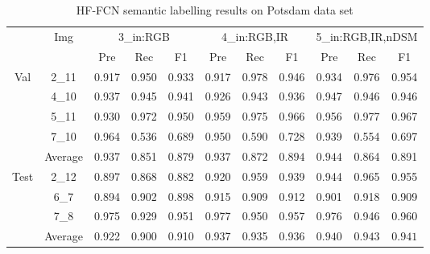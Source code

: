 \documentclass{article}
\begin{document}
   \begin{table}[!h!b!p]
    \caption {HF-FCN semantic labelling results on Potsdam data set}
    \begin{center}
    \begin{tabular}{c|c|c|c|c|c|c|c|c|c|c}
     \hline
    &\multirow{2}{*}{Img}&\multicolumn{3}{c}{3\_in:RGB} &\multicolumn{3}{|c|}{4\_in:RGB,IR}&\multicolumn{3}{c}{5\_in:RGB,IR,nDSM}\\
     \cline{3-11}
    && Pre &Rec & F1 &Pre &Rec &F1&Pre &Rec &F1\\
    \hline\hline
    \multirow{4}{*}{Val}&2\_11&0.917&0.950&0.933&0.917&0.978&0.946&0.934&0.976&0.954\\
    &4\_10&0.937&0.945&0.941&0.926&0.943&0.936&0.947&0.946&0.946\\
    &5\_11&0.930&0.972&0.950&0.959&0.975&0.966&0.956&0.977&0.967\\
    &7\_10&0.964&0.536&0.689&0.950&0.590&0.728&0.939&0.554&0.697\\
    \cline{2-11}
    &{Average}&0.937&0.851&0.879&0.937&$\bm{0.872}$&$\bm{0.894}$&$\bm{0.944}$&0.864&0.891\\
    \hline\hline
    \multirow{3}{*}{Test}&2\_12&0.897&0.868&0.882&0.920&0.959&0.939&0.944&0.965&0.955\\
    &6\_7&0.894&0.902&0.898&0.915&0.909&0.912&0.901&0.918&0.909\\
    &7\_8&0.975&0.929&0.951&0.977&0.950&0.957&0.976&0.946&0.960\\
    \cline{2-11}
    &{Average}&0.922&0.900&0.910&0.937&0.935&0.936&$\bm{0.940}$&$\bm{0.943}$&$\bm{0.941}$\\
    \hline\hline
   \end{tabular}
   \end{center}
   \end{table}
\end{document}
